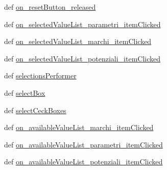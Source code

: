 \begin{DoxyCompactItemize}
\item 
def \hyperlink{classmmasgis_1_1interrogazioni_1_1MainWindowQuery_a2747bdf54047ee1beae8cc7e1dfcd7d6}{on\_\-resetButton\_\-released}
\item 
def \hyperlink{classmmasgis_1_1interrogazioni_1_1MainWindowQuery_a0a129152264ca50da331e5e82887acef}{on\_\-selectedValueList\_\-parametri\_\-itemClicked}
\item 
def \hyperlink{classmmasgis_1_1interrogazioni_1_1MainWindowQuery_afa2093dbb7a293509c32e5be1401b725}{on\_\-selectedValueList\_\-marchi\_\-itemClicked}
\item 
def \hyperlink{classmmasgis_1_1interrogazioni_1_1MainWindowQuery_a0740a4d3d81bf82f11b6e436b19c86db}{on\_\-selectedValueList\_\-potenziali\_\-itemClicked}
\item 
def \hyperlink{classmmasgis_1_1interrogazioni_1_1MainWindowQuery_a4d243154cb6755cba264ede1177441f2}{selectionsPerformer}
\item 
def \hyperlink{classmmasgis_1_1interrogazioni_1_1MainWindowQuery_a4e84a7743e196200692f5b8a1f9d4a08}{selectBox}
\item 
def \hyperlink{classmmasgis_1_1interrogazioni_1_1MainWindowQuery_a64b80fe86447a4a1f495ad63721dc376}{selectCeckBoxes}
\item 
def \hyperlink{classmmasgis_1_1interrogazioni_1_1MainWindowQuery_a5de2a0c79c757c9fbd83e884ee9630e2}{on\_\-availableValueList\_\-marchi\_\-itemClicked}
\item 
def \hyperlink{classmmasgis_1_1interrogazioni_1_1MainWindowQuery_aa53d965ac4d58b42c0dafef32e6ee220}{on\_\-availableValueList\_\-parametri\_\-itemClicked}
\item 
def \hyperlink{classmmasgis_1_1interrogazioni_1_1MainWindowQuery_aae36aaea432b55ee7dc68470c40a6ec4}{on\_\-availableValueList\_\-potenziali\_\-itemClicked}
\end{DoxyCompactItemize}
